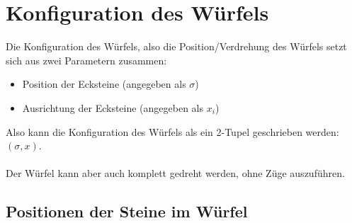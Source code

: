 \documentclass[12pt,a4paper, usenames, dvipsnames]{article}
\begin{document}









\section{Konfiguration des Würfels}
Die Konfiguration des Würfels, also die Position/Verdrehung des Würfels setzt sich aus zwei Parametern zusammen: \\
\begin{itemize}
\item Position der Ecksteine (angegeben als $\sigma$)
\item Ausrichtung der Ecksteine (angegeben als $x_i$)
\end{itemize}
Also kann die Konfiguration des Würfels als ein 2-Tupel geschrieben werden: $(\sigma, x)$. \\
\\
Der Würfel kann aber auch komplett gedreht werden, ohne Züge auszuführen.



















\subsection*{Positionen der Steine im Würfel} 
\end{document}
